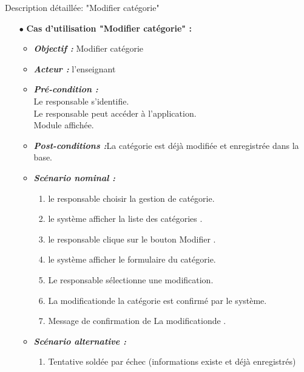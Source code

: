 {\Large \color{cyan} Description détaillée: "Modifier catégorie"}
\begin{itemize}
	\item[$\bullet$] \textbf{Cas d’utilisation "Modifier catégorie" :} 
	\medskip
	\begin{itemize}
		\item \textit{\textbf{Objectif :}} Modifier catégorie	
		\item \textit{\textbf{Acteur :}}  l'enseignant
		\item \textit{\textbf{Pré-condition  :}} \\
		Le responsable s’identifie.\\
		Le responsable peut accéder à l’application.\\
		Module affichée.
		\item \textit{\textbf{Post-conditions   :}}La catégorie est déjà modifiée et enregistrée dans
		la base. 
		\item \textit{\textbf{Scénario nominal :}}
		\begin{enumerate}
			\item le responsable choisir la gestion de catégorie.
			\item le système afficher la liste des catégories .
			\item le responsable clique sur le bouton Modifier .
			
			\item le système afficher le formulaire du catégorie. 
			\item  Le responsable sélectionne une modification. 
			\item La modificationde la catégorie est confirmé par le système. 
			\item Message de confirmation de La modificationde .
			
		\end{enumerate}
		\item \textit{\textbf{Scénario alternative :}}
		\begin{enumerate}
			\item Tentative soldée par échec (informations existe et
			déjà enregistrés)
		\end{enumerate}
	\end{itemize}
\end{itemize}	
\bigskip



